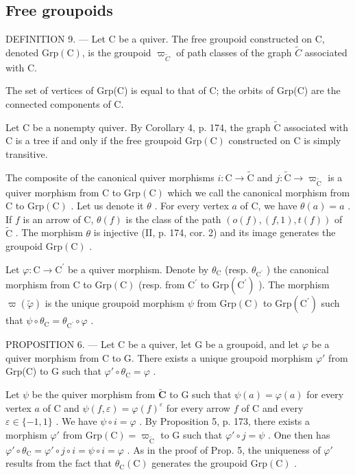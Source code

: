 \subsection{Free groupoids}

DEFINITION 9. --- Let C be a quiver. The free groupoid constructed on C, denoted \(\mathrm{Grp}(\mathrm{C})\), is the groupoid \(\varpi_{\widetilde{C}}\) of path classes of the graph \(\widetilde{C}\) associated with C.

The set of vertices of Grp(C) is equal to that of C; the orbits of Grp(C) are the connected components of C.

Let C be a nonempty quiver. By Corollary 4, p. 174, the graph \(\widetilde{\mathrm{C}}\) associated with C is a tree if and only if the free groupoid \(\mathrm{Grp}(\mathrm{C})\) constructed on C is simply transitive.

The composite of the canonical quiver morphisms \(i\colon \mathrm{C}\to \widetilde{\mathrm{C}}\) and \(j\colon \widetilde{\mathrm{C}}\to \varpi_{\widetilde{\mathrm{C}}}\) is a quiver morphism from C to \(\mathrm{Grp}(\mathrm{C})\) which we call the canonical morphism from C to \(\mathrm{Grp}(\mathrm{C})\) . Let us denote it \(\theta\) . For every vertex \(a\) of C, we have \(\theta (a) = a\) . If \(f\) is an arrow of C, \(\theta (f)\) is the class of the path \((o(f),(f,1),t(f))\) of \(\widetilde{\mathrm{C}}\) . The morphism \(\theta\) is injective (II, p. 174, cor. 2) and its image generates the groupoid \(\mathrm{Grp}(\mathrm{C})\) .

Let \(\varphi\colon\mathrm{C}\to\mathrm{C}^{\prime}\) be a quiver morphism. Denote by \(\theta_{\mathrm{C}}\) (resp. \(\theta_{\mathrm{C}^{\prime}}\) ) the canonical morphism from C to \(\mathrm{Grp}(\mathrm{C})\) (resp. from \(\mathrm{C}^{\prime}\) to \(\mathrm{Grp}(\mathrm{C}^{\prime})\) ). The morphism \(\varpi(\widetilde{\varphi})\) is the unique groupoid morphism \(\psi\) from \(\mathrm{Grp}(\mathrm{C})\) to \(\mathrm{Grp}(\mathrm{C}^{\prime})\) such that \(\psi\circ\theta_{\mathrm{C}}=\theta_{\mathrm{C}^{\prime}}\circ\varphi\) .

PROPOSITION 6. --- Let C be a quiver, let G be a groupoid, and let \(\varphi\) be a quiver morphism from C to G. There exists a unique groupoid morphism \(\varphi'\) from Grp(C) to G such that \(\varphi' \circ \theta_{\mathrm{C}} = \varphi\) .

Let \(\psi\) be the quiver morphism from \(\widetilde{\mathbf{C}}\) to G such that \(\psi(a) = \varphi(a)\) for every vertex \(a\) of C and \(\psi(f, \varepsilon) = \varphi(f)^{\varepsilon}\) for every arrow \(f\) of C and every \(\varepsilon \in \{-1, 1\}\) . We have \(\psi \circ i = \varphi\) . By Proposition 5, p. 173, there exists a morphism \(\varphi'\) from \(\mathrm{Grp}(\mathrm{C}) = \varpi_{\widetilde{\mathrm{C}}}\) to G such that \(\varphi' \circ j = \psi\) . One then has \(\varphi' \circ \theta_{\mathrm{C}} = \varphi' \circ j \circ i = \psi \circ i = \varphi\) . As in the proof of Prop. 5, the uniqueness of \(\varphi'\) results from the fact that \(\theta_{\mathrm{C}}(\mathrm{C})\) generates the groupoid \(\mathrm{Grp}(\mathrm{C})\) .

